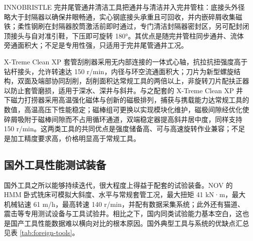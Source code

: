 INNOBRISTLE 完井尾管通井清洁工具把通井与清洁并入完井管柱：底接头外径略大于封隔器以确保井眼畅通，实心钢底接头承重且可回收，并内嵌碎屑收集磁铁；柔性钢刷在封隔器胶筒激活前即时通过，专门清洁封隔器密封区，另可配封闭顶接头与自对准引鞋，下压即可旋转 180°。其优点是随完井管柱同步通井、流体旁通面积大；不足是专用性强，只适用于完井尾管通井工况。

X-Treme Clean XP 套管刮削器采用无内部连接的一体式心轴，抗拉抗扭强度高于钻杆接头，允许转速达 150 r/min，内径与环空流通面积大；刀片为新型螺旋结构，双面及端部协同刮削，刮削面积达常规工具的两倍以上，非旋转刀片配扶正器以防止套管磨损，适用于深水、深井与斜井。与之配套的 X-Treme Clean XP 井下磁力打捞器采用高温强化磁体与创新的磁极排列，捕获与携载能力达常规工具的数值，高温高压下性能稳定；磁棒组可更换以实现模块化维护，磁极间隙经优化使碎屑吸附于磁棒间隙而不占用循环通道，双端稳定器提高斜井居中度，同样支持 150 r/min。这两类工具的共同优点是强度储备高、可与高速旋转作业兼容；不足是加工精度要求高，价格明显高于常规工具。

\subsection{国外工具性能测试装备}

国外工具之所以能够持续迭代，很大程度上得益于配套的试验装备。NOV 的 HMM 卧式铣床可模拟大斜度、水平与常规套管工况，最大扭矩 41 kN·m，最大机械钻速 61 m/h，最高转速 140 r/min，并配有数据采集系统；此外还有猫道、震击等专用测试设备与工具试验井。相比之下，国内同类试验能力基本空白，这也是国产工具性能数据难以横向对比的根本原因。国外典型工具与系统的优缺点汇总见表 \ref{tab:foreign-tools}。

